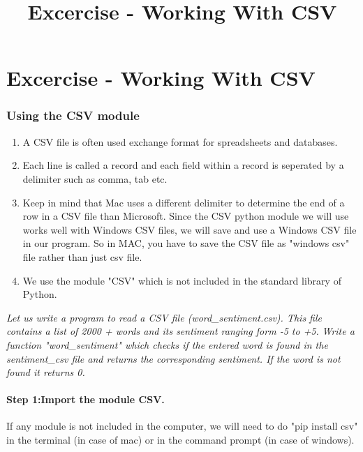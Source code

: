 \documentclass[11pt]{article}
\title{Excercise - Working With CSV}
\providecommand{\tightlist}{%
      \setlength{\itemsep}{0pt}\setlength{\parskip}{0pt}}
\begin{document}
    
    
    \maketitle
    
    

    
    \section{Excercise - Working With
CSV}\label{excercise---working-with-csv}

    \subsubsection{Using the CSV module}\label{using-the-csv-module}

\begin{enumerate}
\def\labelenumi{\arabic{enumi}.}
\tightlist
\item
  A CSV file is often used exchange format for spreadsheets and
  databases.
\item
  Each line is called a record and each field within a record is
  seperated by a delimiter such as comma, tab etc.
\item
  Keep in mind that Mac uses a different delimiter to determine the end
  of a row in a CSV file than Microsoft. Since the CSV python module we
  will use works well with Windows CSV files, we will save and use a
  Windows CSV file in our program. So in MAC, you have to save the CSV
  file as "windows csv" file rather than just csv file.
\item
  We use the module "CSV" which is not included in the standard library
  of Python.
\end{enumerate}

    \emph{Let us write a program to read a CSV file (word\_sentiment.csv).
This file contains a list of 2000 + words and its sentiment ranging form
-5 to +5.} \emph{Write a function "word\_sentiment" which checks if the
entered word is found in the sentiment\_csv file and returns the
corresponding sentiment. If the word is not found it returns 0.}

    \paragraph{Step 1:Import the module
CSV.}\label{step-1import-the-module-csv.}

If any module is not included in the computer, we will need to do "pip
install csv" in the terminal (in case of mac) or in the command prompt
(in case of windows).
\end{document}
